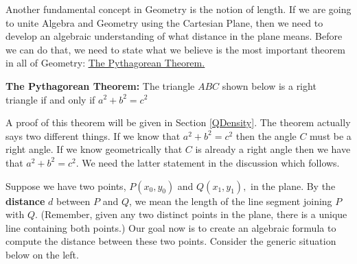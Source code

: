 \documentclass{ximera}
\begin{document}
Another fundamental concept in Geometry is the notion of length.  If we are going to unite Algebra and Geometry using the Cartesian Plane, then we need to develop an algebraic understanding of what distance in the plane means.  Before we can do that, we need to state what we believe is the most important theorem in all of Geometry: \href{http://en.wikipedia.org/wiki/Pythagorean_Theorem}{\underline{The Pythagorean Theorem.}}

 
 

\begin{theorem} \label{PythagoreanStatement}\textbf{The Pythagorean Theorem:}  The triangle $ABC$ shown below is a right triangle if and only if $a^{2} + b^{2} = c^{2}$

\begin{center}
\end{center}

\end{theorem}


 

A proof of this theorem will be given in Section \ref{QDensity}.  The theorem actually says two different things.  If we know that $a^{2} + b^{2} = c^{2}$ then the angle $C$ must be a right angle.  If we know geometrically that $C$ is already a right angle then we have that $a^{2} + b^{2} = c^{2}$.  We need the latter statement in the discussion which follows.  

 

Suppose we have two points, $P\left(x_0, y_0\right)$ and $Q\left(x_1, y_1\right),$ in the plane. By the  \textbf{distance} $d$  between $P$ and $Q$, we mean the length of the line segment joining $P$ with $Q$.  (Remember, given any two distinct points in the plane, there is a unique line containing both points.)  Our goal now is to create an algebraic formula to compute the distance between these two points. Consider the generic situation below on the left.
\end{document}
